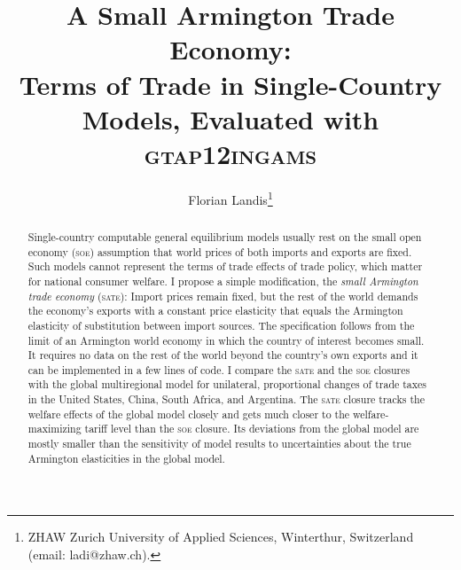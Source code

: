 \documentclass{jgea}
\newcommand{\SOE}{\textsc{soe}\xspace}
\newcommand{\SATE}{\textsc{sate}\xspace}
\newcommand{\GTAP}{\textsc{gtap}\xspace}
\newcommand{\GTAPINGAMS}{\textsc{gtapingams}\xspace}
\newcommand{\GTAPtwelve}{\textsc{gtap12ingams}\xspace}
\newcommand{\GTAPnine}{\textsc{gtap9ingams}\xspace}
\begin{document}
\title{A Small Armington Trade Economy: \\ Terms of Trade in Single-Country Models, Evaluated with \GTAPtwelve} \author{ Florian Landis\footnote{ZHAW Zurich University of Applied Sciences, Winterthur, Switzerland (email: ladi@zhaw.ch).} }

\maketitle

\begin{abstract}

Single-country computable general equilibrium models usually rest on the small open economy (\SOE) assumption that world prices of both imports and exports are fixed.
Such models cannot represent the terms of trade effects of trade policy, which matter for national consumer welfare.
I propose a simple modification, the \emph{small Armington trade economy} (\SATE): Import prices remain fixed, but the rest of the world demands the economy's exports with a constant price elasticity that equals the Armington elasticity of substitution between import sources.
The specification follows from the limit of an Armington world economy in which the country of interest becomes small.
It requires no data on the rest of the world beyond the country's own exports and it can be implemented in a few lines of code.
I compare the \SATE and the \SOE closures with the global multiregional model for unilateral, proportional changes of trade taxes in the United States, China, South Africa, and Argentina.
The \SATE closure tracks the welfare effects of the global model closely and gets much closer to the welfare-maximizing tariff level than the \SOE closure.
Its deviations from the global model are mostly smaller than the sensitivity of model results to uncertainties about the true  Armington elasticities in the global model.

\end{abstract}
\end{document}
